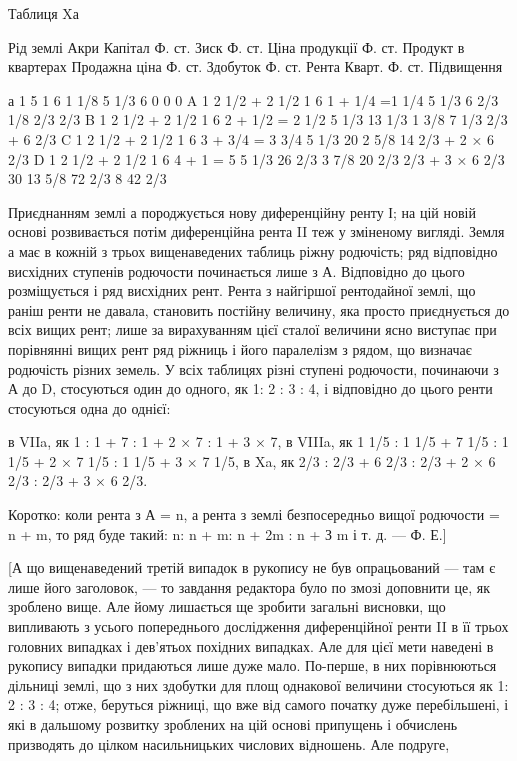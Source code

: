 Таблиця Xа

Рід землі
Акри
Капітал Ф. ст.
Зиск Ф. ст.
Ціна продукції Ф. ст.
Продукт в квартерах
Продажна ціна Ф. ст.
Здобуток Ф. ст.
Рента Кварт. Ф. ст.
Підвищення

а  1                5            1  6                  1 1/8   5 1/3   6            0          0
      0
A  1  2 1/2 + 2 1/2     1  6  1 +  1/4 =1 1/4   5 1/3   6 2/3     1/8       2/3       2/3
B  1  2 1/2 + 2 1/2     1  6  2 + 1/2 = 2 1/2   5 1/3   13 1/3   1 3/8    7 1/3    2/3 + 6 2/3
C  1  2 1/2 + 2 1/2     1  6  3 + 3/4 = 3 3/4   5 1/3   20          2 5/8   14         2/3 + 2 × 6
2/3
D  1  2 1/2 + 2 1/2     1  6  4 + 1 = 5             5 1/3   26 2/3   3 7/8   20 2/3   2/3 + 3 × 6
2/3
                                        30             13 5/8                72 2/3   8          42
2/3

Приєднанням землі а породжується нову диференційну ренту І; на цій
новій основі розвивається потім диференційна рента II теж у зміненому вигляді.
Земля а має в кожній з трьох вищенаведених таблиць ріжну родючість; ряд
відповідно висхідних ступенів родючости починається лише з А. Відповідно до
цього розміщується і ряд висхідних рент. Рента з найгіршої рентодайної землі,
що раніш ренти не давала, становить постійну величину, яка просто приєднується
до всіх вищих рент; лише за вирахуванням цієї сталої величини ясно виступає
при порівнянні вищих рент ряд ріжниць і його паралелізм з рядом, що
визначає родючість різних земель. У всіх таблицях різні ступені родючости, починаючи
з А до D, стосуються один до одного, як 1: 2 : 3 : 4, і відповідно до
цього ренти стосуються одна до однієї:

в VIIa, як 1 : 1 + 7 : 1 + 2 × 7 : 1 + 3 × 7,
в VIIIa, як 1 1/5 : 1 1/5 + 7 1/5 : 1  1/5 + 2 × 7 1/5 : 1 1/5 + 3 × 7 1/5,
в Xa, як   2/3 : 2/3 + 6 2/3 : 2/3 + 2 × 6 2/3 : 2/3 + 3 × 6 2/3.

Коротко: коли рента з А = n, а рента з землі безпосередньо вищої родючости
= n + m, то ряд буде такий: n: n + m: n + 2m : n + З m і т. д. — Ф. Е.]

[А що вищенаведений третій випадок в рукопису не був опрацьований —
там є лише його заголовок, — то завдання редактора було по змозі доповнити
це, як зроблено вище. Але йому лишається ще зробити загальні висновки, що
випливають з усього попереднього дослідження диференційної ренти II в її трьох
головних випадках і дев’ятьох похідних випадках. Але для цієї мети наведені
в рукопису випадки придаються лише дуже мало. По-перше, в них порівнюються
дільниці землі, що з них здобутки для площ однакової величини стосуються
як 1: 2 : 3 : 4; отже, беруться ріжниці, що вже від самого початку дуже перебільшені,
і які в дальшому розвитку зроблених на цій основі припущень і обчислень
призводять до цілком насильницьких числових відношень. Але подруге,
\parbreak{}  %
